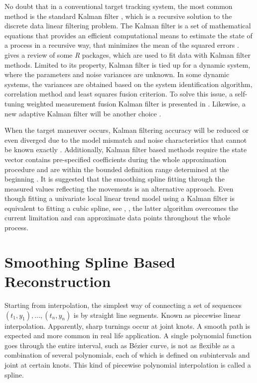 No doubt that in a conventional target tracking system, the most common method is the standard Kalman filter \cite{kalman1960new}, which is a recursive solution to the discrete data linear filtering problem. The Kalman filter is a set of mathematical equations that provides an efficient computational means to estimate the state of a process in a recursive way, that minimizes the mean of the squared errors \cite{bishop2001introduction}. \cite{tusell2011kalman} gives a review of some \textit{R} packages, which are used to fit data with Kalman filter methods. Limited to its property, Kalman filter is tied up for a dynamic system, where the parameters and noise variances are unknown. In some dynamic systems, the variances are obtained based on the system identification algorithm, correlation method and least squares fusion criterion. To solve this issue, a self-tuning weighted measurement fusion Kalman filter is presented in \cite{ran2010self}. Likewise, a new adaptive Kalman filter will be another choice \cite{oussalah2001adaptive}. 

When the target maneuver occurs, Kalman filtering accuracy will be reduced or even diverged due to the model mismatch and noise characteristics that cannot be known exactly \cite{liu2014filtering}. Additionally, Kalman filter based methods require the state vector contains pre-specified coefficients during the whole approximation procedure and are within the bounded definition range determined at the beginning \cite{jauch2017recursive}. It is suggested that the smoothing spline fitting through the measured values reflecting the movements is an alternative approach. Even though fitting a univariate local linear trend model using a Kalman filter is equivalent to fitting a cubic spline, see \cite{eubank2004simple}, \cite{durbin2012time}, the latter algorithm overcomes the current limitation and can approximate data points throughout the whole process. 

 

\section{Smoothing Spline Based Reconstruction}

Starting from interpolation, the simplest way of connecting a set of sequences $(t_1,y_1),\ldots, (t_n,y_n)$ is by straight line segments. Known as piecewise
linear interpolation. Apparently, sharp turnings occur at joint knots. A smooth path is expected and more common in real life application. A single polynomial function goes through the entire interval, such as B\'ezier curve, is not as flexible as a combination of several polynomials, each of which is defined on subintervals and joint at certain knots. This kind of piecewise polynomial interpolation is called a spline. 

